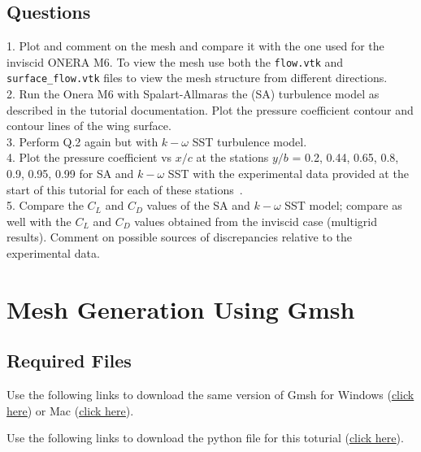 \section*{Questions}
1. Plot and comment on the mesh and compare it with the one used for the inviscid ONERA M6. To view the mesh use both the \texttt{flow.vtk} and \texttt{surface\_flow.vtk} files to view the mesh structure from different directions. \\
2. Run the Onera M6 with Spalart-Allmaras the (SA) turbulence model as described in the tutorial documentation. Plot the pressure coefficient contour and contour lines of the wing surface. \\
3. Perform Q.2 again but with $k-\omega$ SST turbulence model. \\
4. Plot the pressure coefficient vs $x/c$ at the stations $y/b$ = 0.2, 0.44, 0.65, 0.8, 0.9, 0.95, 0.99 for SA and $k-\omega$ SST with the experimental data provided at the start of this tutorial for each of these stations~\cite{schmitt1979pressure}. \\
5. Compare the $C_L$ and $C_D$ values of the SA and $k-\omega$ SST model; compare as well with the $C_L$ and $C_D$ values obtained from the inviscid case (multigrid results). Comment on possible sources of discrepancies relative to the experimental data.
\chapter{Mesh Generation Using Gmsh}
\label{ch:Mesh Generation Unisg Gmsh}
\section*{Required Files}
\begin{gmshnote}
	Use the following links to download the same version of Gmsh for Windows (\href{https://users.encs.concordia.ca/~bvermeir/book/executables/windows/gmsh-3.0.5-Windows64.zip}{\underline{click here}}) or Mac (\href{https://users.encs.concordia.ca/~bvermeir/book/executables/osx/gmsh-3.0.5-MacOSX.dmg}{\underline{click here}}).
\end{gmshnote}
\begin{pythonnote}
	Use the following links to download the python file for this toturial (\href{https://gitlab.com/bvermeir/book-cfd/blob/master/tutorial/tut6_mesh_generation/gmshconverter.py}{\underline{click here}}).
\end{pythonnote}

